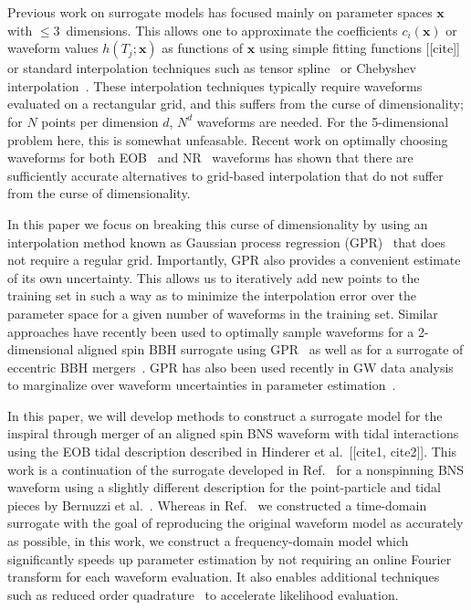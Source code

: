 \documentclass[prd,aps,letter,twocolumn,floatfix,notitlepage,nofootinbib]{revtex4-1}
\def\bx{\mathbf{x}}
\begin{document}
Previous work on surrogate models has focused mainly on parameter spaces $\bx$ with $\le 3$~dimensions. This allows one to approximate the coefficients $c_i(\bx)$ or waveform values $h(T_j; \bx)$ as functions of $\bx$ using simple fitting functions [[cite]] or standard interpolation techniques such as tensor spline~\cite{Puerrer2014, Puerrer2015} or Chebyshev interpolation~\cite{LackeyBernuzziGalley2017}. These interpolation techniques typically require waveforms evaluated on a rectangular grid, and this suffers from the curse of dimensionality; for $N$ points per dimension $d$,  $N^d$ waveforms are needed. For the 5-dimensional problem here, this is somewhat unfeasable. Recent work on optimally choosing waveforms for both EOB~\cite{DoctorFarrHolz2017} and NR~\cite{BlackmanFieldScheel2017a, BlackmanFieldScheel2017b} waveforms has shown that there are sufficiently accurate alternatives to grid-based interpolation that do not suffer from the curse of dimensionality.

In this paper we focus on breaking this curse of dimensionality by using an interpolation method known as Gaussian process regression (GPR)~\cite{RasmussenWilliams2006} that does not require a regular grid. Importantly, GPR also provides a convenient estimate of its own uncertainty. This allows us to iteratively add new points to the training set in such a way as to minimize the interpolation error over the parameter space for a given number of waveforms in the training set. Similar approaches have recently been used to optimally sample waveforms for a 2-dimensional aligned spin BBH surrogate using GPR~\cite{DoctorFarrHolz2017} as well as for a surrogate of eccentric BBH mergers~\cite{HuertaMooreKumar2017}. GPR has also been used recently in GW data analysis to marginalize over waveform uncertainties in parameter estimation~\cite{MooreGair2014, MooreBerryChua2016}.

In this paper, we will develop methods to construct a surrogate model for the inspiral through merger of an aligned spin BNS waveform with tidal interactions using the EOB tidal description described in Hinderer et al.~[[cite1, cite2]]. This work is a continuation of the surrogate developed in Ref.~\cite{LackeyBernuzziGalley2017} for a nonspinning BNS waveform using a slightly different description for the point-particle and tidal pieces by Bernuzzi et al.~\cite{Bernuzzi:2014owa}. Whereas in Ref.~\cite{LackeyBernuzziGalley2017} we constructed a time-domain surrogate with the goal of reproducing the original waveform model as accurately as possible, in this work, we construct a frequency-domain model which significantly speeds up parameter estimation by not requiring an online Fourier transform for each waveform evaluation. It also enables additional techniques such as reduced order quadrature~\cite{Antil2013, CanizaresFieldGair2013, CanizaresFieldGair2015} to accelerate likelihood evaluation.
\end{document}
